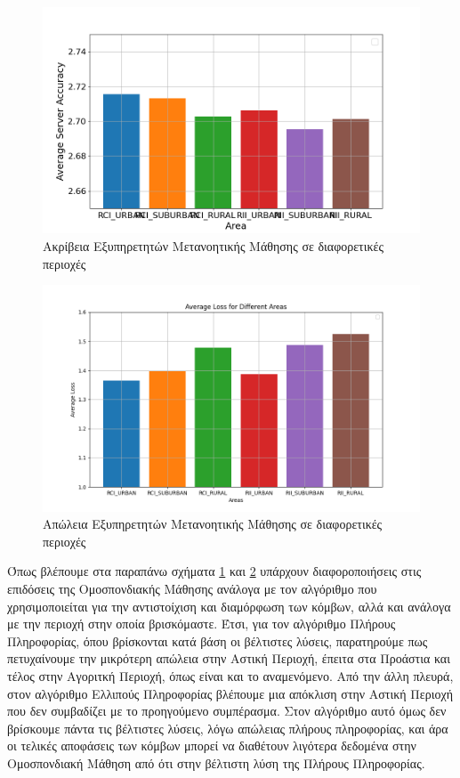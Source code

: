 \begin{figure}[H]
    \centering
    \includegraphics[width=\textwidth]{figures/chapter4/Area_Average_Accuracy.png}
    \caption{Ακρίβεια Εξυπηρετητών Μετανοητικής Μάθησης σε διαφορετικές περιοχές}
    \label{fig21}
\end{figure}

\begin{figure}[H]
    \centering
    \includegraphics[width=\textwidth]{figures/chapter4/Area_of_Average_Loss.png}
    \caption{Απώλεια Εξυπηρετητών Μετανοητικής Μάθησης σε διαφορετικές περιοχές}
    \label{fig22}
\end{figure}

\newpage

Όπως βλέπουμε στα παραπάνω σχήματα \ref{fig21} και \ref{fig22} υπάρχουν διαφοροποιήσεις στις επιδόσεις της Ομοσπονδιακής Μάθησης ανάλογα με τον αλγόριθμο που χρησιμοποιείται για την αντιστοίχιση και διαμόρφωση των κόμβων, αλλά και ανάλογα με την περιοχή στην οποία βρισκόμαστε. Έτσι, για τον αλγόριθμο Πλήρους Πληροφορίας, όπου βρίσκονται κατά βάση οι βέλτιστες λύσεις, παρατηρούμε πως πετυχαίνουμε την μικρότερη απώλεια στην Αστική Περιοχή, έπειτα στα Προάστια και τέλος στην Αγοριτκή Περιοχή, όπως είναι και το αναμενόμενο. Από την άλλη πλευρά, στον αλγόριθμο Ελλιπούς Πληροφορίας βλέπουμε μια απόκλιση στην Αστική Περιοχή που δεν συμβαδίζει με το προηγούμενο συμπέρασμα. Στον αλγόριθμο αυτό όμως δεν βρίσκουμε πάντα τις βέλτιστες λύσεις, λόγω απώλειας πλήρους πληροφορίας, και άρα οι τελικές αποφάσεις των κόμβων μπορεί να διαθέτουν λιγότερα δεδομένα στην Ομοσπονδιακή Μάθηση από ότι στην βέλτιστη λύση της Πλήρους Πληροφορίας.

